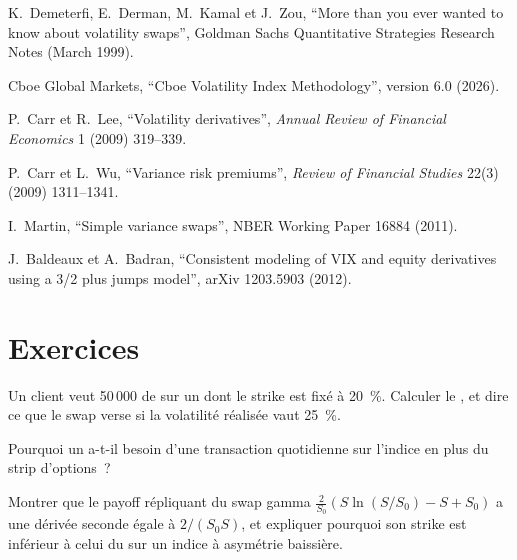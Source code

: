 \begin{omsources}
\item K.~Demeterfi, E.~Derman, M.~Kamal et J.~Zou, ``More than you ever wanted to know about volatility swaps'',
Goldman Sachs Quantitative Strategies Research Notes (March 1999).
\item Cboe Global Markets, ``Cboe Volatility Index Methodology'', version 6.0 (2026).
\item P.~Carr et R.~Lee, ``Volatility derivatives'', \emph{Annual Review of Financial Economics} 1 (2009) 319--339.
\item P.~Carr et L.~Wu, ``Variance risk premiums'', \emph{Review of Financial Studies} 22(3) (2009) 1311--1341.
\item I.~Martin, ``Simple variance swaps'', NBER Working Paper 16884 (2011).
\item J.~Baldeaux et A.~Badran, ``Consistent modeling of VIX and equity derivatives using a 3/2 plus jumps
model'', arXiv 1203.5903 (2012).
\end{omsources}

\section{Exercices}

\begin{exercise}[$\star$]\label{exo:dv:variance-swaps-and-volatility-derivatives:1}
Un client veut 50\,000 de  sur un  dont le strike est fixé à 20~\%. Calculer le , et
dire ce que le swap verse si la volatilité réalisée vaut 25~\%.
\end{exercise}

\begin{exercise}[$\star$]\label{exo:dv:variance-swaps-and-volatility-derivatives:2}
Pourquoi un  a-t-il besoin d'une transaction quotidienne sur l'indice en plus du strip d'options~?
\end{exercise}

\begin{exercise}[$\star$]\label{exo:dv:variance-swaps-and-volatility-derivatives:3}
Montrer que le payoff répliquant du swap gamma $\frac2{S_0}(S\ln(S/S_0)-S+S_0)$ a une dérivée seconde égale à $2/(S_0S)$,
et expliquer pourquoi son strike est inférieur à celui du  sur un indice à asymétrie baissière.
\end{exercise}

